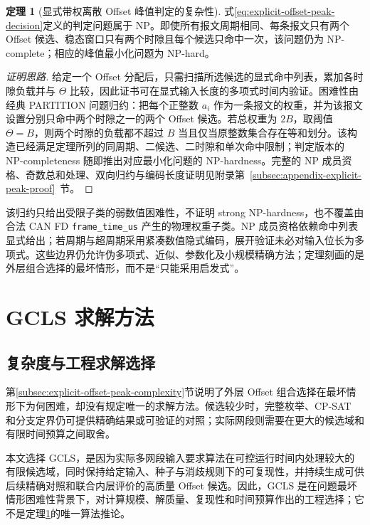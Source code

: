 \documentclass[UTF8,a4paper,twoside,zihao=-4]{ctexart}
\numberwithin{equation}{section}
\numberwithin{figure}{section}
\numberwithin{table}{section}
\theoremstyle{definition}
\newtheorem{theorem}{定理}
\numberwithin{algocf}{section}
\begin{document}
\begin{theorem}[显式带权离散 Offset 峰值判定的复杂性]
\label{thm:explicit-offset-peak-complexity}
式\eqref{eq:explicit-offset-peak-decision}定义的判定问题属于 NP。即使所有报文周期相同、每条报文只有两个 Offset 候选、稳态窗口只有两个时隙且每个候选只命中一次，该问题仍为 NP-complete；相应的峰值最小化问题为 NP-hard。
\end{theorem}

\begin{proof}[\normalfont 证明思路]
给定一个 Offset 分配后，只需扫描所选候选的显式命中列表，累加各时隙负载并与 $\Theta$ 比较，因此证书可在显式输入长度的多项式时间内验证。困难性由经典 PARTITION 问题归约\cite{karp1972}：把每个正整数 $a_i$ 作为一条报文的权重，并为该报文设置分别只命中两个时隙之一的两个 Offset 候选。若总权重为 $2B$，取阈值 $\Theta=B$，则两个时隙的负载都不超过 $B$ 当且仅当原整数集合存在等和划分。该构造已经满足定理所列的同周期、二候选、二时隙和单次命中限制；判定版本的 NP-completeness 随即推出对应最小化问题的 NP-hardness。完整的 NP 成员资格、奇数总和处理、双向归约与编码长度证明见附录第~\ref{subsec:appendix-explicit-peak-proof}~节。
\end{proof}

该归约只给出受限子类的弱数值困难性，不证明 strong NP-hardness，也不覆盖由合法 CAN FD \texttt{frame\_time\_us} 产生的物理权重子类。NP 成员资格依赖命中列表显式给出；若周期与超周期采用紧凑数值隐式编码，展开验证未必对输入位长为多项式\cite{zeng2006periodic,short2010periodic}。这些边界仍允许伪多项式、近似、参数化及小规模精确方法；定理刻画的是外层组合选择的最坏情形，而不是“只能采用启发式”。


\clearpage
\section{GCLS 求解方法}
\label{sec:gcls-method}

\subsection{复杂度与工程求解选择}
\label{subsec:gcls-engineering-choice}

第\ref{subsec:explicit-offset-peak-complexity}节说明了外层 Offset 组合选择在最坏情形下为何困难，却没有规定唯一的求解方法。候选较少时，完整枚举、CP-SAT 和分支定界仍可提供精确结果或可验证的对照；实际网段则需要在更大的候选域和有限时间预算之间取舍。

本文选择 GCLS，是因为实际多网段输入要求算法在可控运行时间内处理较大的有限候选域，同时保持给定输入、种子与消歧规则下的可复现性，并持续生成可供后续精确对照和联合内层评价的高质量 Offset 候选。因此，GCLS 是在问题最坏情形困难性背景下，对计算规模、解质量、复现性和时间预算作出的工程选择；它不是定理\ref{thm:explicit-offset-peak-complexity}的唯一算法推论。
\end{document}
